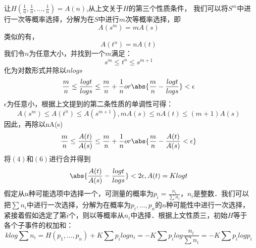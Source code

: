 让$H(\frac{1}{n},\frac{1}{n},...,\frac{1}{n})=A(n)$,从上文关于$H$的第三个性质条件，
我们可以将$S^m$中进行一次等概率选择，分解为在$S$中进行$m$次等概率选择，即
\begin{equation}
A(s^m)=mA(s)
\end{equation}
类似的有，
\begin{equation}
A(t^n)=nA(t)
\end{equation}
我们令$n$为任意大小，并找到一个$m$满足：
\begin{equation}
s^m\leq t^n\leq s^{m+1}
\end{equation}
化为对数形式并除以$nlogs$
\begin{equation}
\frac{m}{n}\leq \frac{logt}{logs}\leq \frac{m}{n}+\frac{1}{n} or \abs{\frac{m}{n}-\frac{logt}{logs}}< \epsilon
\end{equation}
$\epsilon$为任意小，根据上文提到的第二条性质的单调性可得：
\begin{equation}
A(s^m)\leq A(t^n) \leq A(s^{m+1}), mA(s)\leq nA(t) \leq (m+1)A(s)
\end{equation}
因此，再除以nA(s)
\begin{equation}
\frac{m}{n}\leq \frac{A(t)}{A(s)}\leq \frac{m}{n}+\frac{1}{n} or \abs{\frac{m}{n} -\frac{A(t)}{A(s)} <\epsilon}
\end{equation}
将$(4)$和$(6)$进行合并得到
\begin{equation}
\abs{\frac{A(t)}{A(s)} - \frac{logt}{logs}} <2\epsilon ,A(t)=Klogt
\end{equation}
假定从n种可能选项中选择一个，可测量的概率为$p_i=\frac{n_i}{\sum n_i}$，$n_i$是整数．我们可以把$\sum{n_i}$中进行一次选择，分解为在概率为$p_i,...,p_n$的$n$种可能性中进行一次选择，紧接着假如选定了第$i$个，则以等概率从$n_i$中选择．根据上文性质三，初始$H$等于各个子事件的权加和：
\begin{equation}
klog\sum n_i=H(p_1,...,p_n)+K\sum {p_ilogn_i}=-K\sum {p_ilog\frac{n_i}{\sum n_i}}=-K\sum {p_ilogp_i}
\end{equation}
